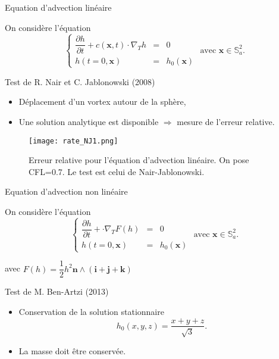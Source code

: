 \documentclass[11pt]{beamer}
\begin{document}
\begin{frame}{Equation d'advection linéaire}

On considère l'équation
$$
\left\lbrace
\begin{array}{rcl}
\dfrac{\partial h}{\partial t} + c(\mathbf{x},t) \cdot \nabla_T h & = & 0  \\
h(t=0,\mathbf{x}) & = & h_0(\mathbf{x})
\end{array}
\right. \text{ avec } \mathbf{x} \in \mathbb{S}_a^2.
$$

\begin{exampleblock}{Test de R. Nair et C. Jablonowski (2008)}
\begin{itemize}
\item Déplacement d'un vortex autour de la sphère,
\item Une solution analytique est disponible $\Rightarrow$ mesure de l'erreur relative.
\end{itemize}
\end{exampleblock}
\end{frame}


\begin{frame}
\begin{figure}
\begin{center}
\texttt{[image: rate\_NJ1.png]}
\end{center}
\caption{Erreur relative pour l'équation d'advection linéaire. On pose CFL=0.7. Le test est celui de Nair-Jablonowski.}
\end{figure}
\end{frame}

















\begin{frame}{Equation d'advection non linéaire}

On considère l'équation
$$
\left\lbrace
\begin{array}{rcl}
\dfrac{\partial h}{\partial t} + \cdot \nabla_T F(h) & = & 0  \\
h(t=0,\mathbf{x}) & = & h_0(\mathbf{x})
\end{array}
\right. \text{ avec } \mathbf{x} \in \mathbb{S}_a^2.
$$

avec $F(h) = \dfrac{1}{2} h^2 \mathbf{n} \wedge (\mathbf{i} + \mathbf{j} + \mathbf{k})$ 

\begin{exampleblock}{Test de M. Ben-Artzi  (2013)}
\begin{itemize}
\item Conservation de la solution stationnaire 
$$
h_0(x,y,z) = \dfrac{x+y+z}{\sqrt{3}}.
$$
\item La masse doit être conservée.
\end{itemize}
\end{exampleblock}
\end{frame}
\end{document}
